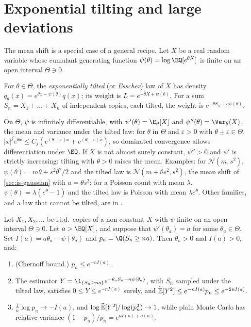
\section{Exponential tilting and large deviations}\label{sec:is-tilting}

The mean shift is a special case of a general recipe. Let $X$ be a real random variable whose
cumulant generating function $\psi(\theta)=\log\EQ[e^{\theta X}]$ is finite on an open
interval $\Theta\ni0$.

\begin{definition}\label{def:is-tilting}
For $\theta\in\Theta$, the \emph{exponentially tilted} (or \emph{Esscher}) law of $X$ has
density $q_\theta(x)=e^{\theta x-\psi(\theta)}q(x)$; its weight is
$L=e^{-\theta X+\psi(\theta)}$. For a sum $S_n=X_1+\dots+X_n$ of independent copies, each
tilted, the weight is $e^{-\theta S_n+n\psi(\theta)}$.
\end{definition}

On $\Theta$, $\psi$ is infinitely differentiable, with $\psi'(\theta)=\E_\theta[X]$ and
$\psi''(\theta)=\Var_\theta(X)$, the mean and variance under the tilted law: for $\theta$ in
$\Theta$ and $\varepsilon>0$ with $\theta\pm\varepsilon\in\Theta$,
$|x|^je^{\theta x}\le C_j(e^{(\theta+\varepsilon)x}+e^{(\theta-\varepsilon)x})$, so dominated
convergence allows differentiation under $\EQ$. If $X$ is not almost surely constant,
$\psi''>0$ and $\psi'$ is strictly increasing: tilting with $\theta>0$ raises the mean.
Examples: for $\mathcal N(m,s^2)$, $\psi(\theta)=m\theta+s^2\theta^2/2$ and the tilted law is
$\mathcal N(m+\theta s^2,s^2)$, the mean shift of \cref{sec:is-gaussian} with $a=\theta s^2$;
for a Poisson count with mean $\lambda$, $\psi(\theta)=\lambda(e^\theta-1)$ and the tilted
law is Poisson with mean $\lambda e^\theta$. Other families, and a law that cannot be tilted,
are in .

\begin{proposition}\label{prop:is-tilting}
Let $X_1,X_2,\dots$ be i.i.d.\ copies of a non-constant $X$ with $\psi$ finite on an open
interval $\Theta\ni0$. Let $a>\EQ[X]$, and suppose that $\psi'(\theta_a)=a$ for some
$\theta_a\in\Theta$. Set $I(a)=a\theta_a-\psi(\theta_a)$ and $p_n=\Q(S_n\ge na)$. Then
$\theta_a>0$ and $I(a)>0$, and:
\begin{enumerate}[label=(\roman*)]
  \item (Chernoff bound.) $p_n\le e^{-nI(a)}$.
  \item The estimator $Y=\1_{\{S_n\ge na\}}e^{-\theta_aS_n+n\psi(\theta_a)}$, with $S_n$
    sampled under the tilted law, satisfies $0\le Y\le e^{-nI(a)}$ surely, and
    $\widetilde{\mathbb E}[Y^2]\le e^{-nI(a)}p_n\le e^{-2nI(a)}$.
  \item $\frac1n\log p_n\to-I(a)$, and
    $\log\widetilde{\mathbb E}[Y^2]/\log(p_n^2)\to1$, while plain Monte Carlo has relative variance
    $(1-p_n)/p_n=e^{nI(a)+o(n)}$.
\end{enumerate}
\end{proposition}

